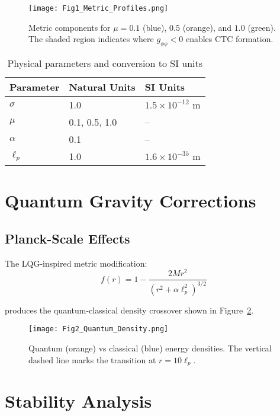 \documentclass[12pt]{article}
\begin{document}
\begin{figure}[H]
\centering
\texttt{[image: Fig1\_Metric\_Profiles.png]}
\caption{Metric components for $\mu = 0.1$ (blue), $0.5$ (orange), and $1.0$ (green). The shaded region indicates where $g_{\phi\phi} < 0$ enables CTC formation.}
\label{fig:metric_profiles}
\end{figure}

\begin{table}[H]
\centering
\caption{Physical parameters and conversion to SI units}
\label{tab:parameters}
\begin{tabular}{lll}
\toprule
Parameter & Natural Units & SI Units \\
\midrule
$\sigma$ & 1.0 & $1.5 \times 10^{-12}$ m \\
$\mu$ & 0.1, 0.5, 1.0 & -- \\
$\alpha$ & 0.1 & -- \\
$\ell_p$ & 1.0 & $1.6 \times 10^{-35}$ m \\
\bottomrule
\end{tabular}
\end{table}

\section{Quantum Gravity Corrections}\label{sec:quantum}

\subsection{Planck-Scale Effects}\label{subsec:planck}
The LQG-inspired metric modification:
\begin{equation}\label{eq:lqg}
f(r) = 1 - \frac{2Mr^2}{(r^2 + \alpha\ell_p^2)^{3/2}}
\end{equation}

produces the quantum-classical density crossover shown in Figure~\ref{fig:quantum_density}.

\begin{figure}[H]
\centering
\texttt{[image: Fig2\_Quantum\_Density.png]}
\caption{Quantum (orange) vs classical (blue) energy densities. The vertical dashed line marks the transition at $r = 10\ell_p$.}
\label{fig:quantum_density}
\end{figure}

\section{Stability Analysis}\label{sec:stability}
\end{document}
